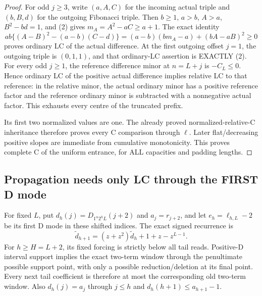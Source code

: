 \begin{proof}
For odd $j\ge3$, write $(a,A,C)$ for the incoming actual triple
and $(b,B,d)$ for the outgoing Fibonacci triple.
Then $b\ge1$, $a>b$, $A>a$, $B^2-bd=1$, and (2) gives
$m_A=A^2-aC\ge a+1$.  The exact identity
\[
 ab\{(A-B)^2-(a-b)(C-d)\}
              =(a-b)(b m_A-a)+(bA-aB)^2\ge0            \tag{8}
\]
proves ordinary LC of the actual difference.
At the first outgoing offset $j=1$, the outgoing triple is
$(0,1,1)$, and that ordinary-LC assertion is EXACTLY (2).
For every odd $j\ge1$, the reference difference minor at $n=L+j$
is $-C_L\le0$.  Hence ordinary LC of the positive actual difference
implies relative LC to that reference: in the relative minor, the
actual ordinary minor has a positive reference factor and the
reference ordinary minor is subtracted with a nonnegative actual factor.
This exhausts every centre of the truncated prefix.

Its first two normalized values are one.  The already proved
normalized-relative-C inheritance therefore proves every C comparison
through $\ell$.  Later flat/decreasing positive slopes are immediate
from cumulative monotonicity.  This proves complete C of the uniform
entrance, for ALL capacities and padding lengths.
\end{proof}

\subsection*{Propagation needs only LC through the FIRST D mode}
For fixed $L$, put $d_h(j)=D_{1^\alpha2^hL}(j+2)$ and
$a_j=r_{j+2}$, and let $e_h=\ell_{h,L}-2$ be its first D mode
in these shifted indices.  The exact signed recurrence is
\[
       \widetilde d_{h+1}=(z+z^2)\widetilde d_h+1+z-z^{L-1}. \tag{9}
\]
For $h\ge H=L+2$, its fixed forcing is strictly below all tail
reads.  Positive-D interval support implies the exact two-term window
through the penultimate possible support point, with only a possible
reduction/deletion at its final point.  Every next tail coefficient is
therefore at most the corresponding old two-term window.
Also $d_h(j)=a_j$ through $j\le h$ and
$d_h(h+1)\le a_{h+1}-1$.

